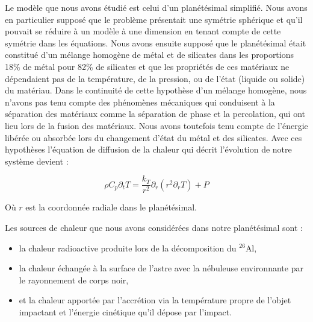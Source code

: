 \documentclass[10pt,a4paper]{article}
\numberwithin{equation}{section}
\begin{document}
Le modèle que nous avons étudié est celui d'un planétésimal simplifié. Nous avons en particulier supposé que le problème présentait une symétrie sphérique et qu'il pouvait se réduire à un modèle à une dimension en tenant compte de cette symétrie dans les équations. Nous avons ensuite supposé que le planétésimal était constitué d'un mélange homogène de métal et de silicates dans les proportions 18\% de métal pour 82\% de silicates et que les propriétés de ces matériaux ne dépendaient pas de la température, de la pression, ou de l'état (liquide ou solide) du matériau. Dans le continuité de cette hypothèse d'un mélange homogène, nous n'avons pas tenu compte des phénomènes mécaniques qui conduisent à la séparation des matériaux comme la séparation de phase et la percolation, qui ont lieu lors de la fusion des matériaux. Nous avons toutefois tenu compte de l’énergie libérée ou absorbée lors du changement d'état du métal et des silicates.
Avec ces hypothèses l'équation de diffusion de la chaleur qui décrit l'évolution de notre système devient :

\begin{equation}
\rho C_p \partial_{t} T = \frac{k_{T}}{r^2} \partial_{r} (  {r}^2 \partial_{r} T)  + P
\end{equation}

Où $r$ est la coordonnée radiale dans le planétésimal.

Les sources de chaleur que nous avons considérées dans notre planétésimal sont :
\begin{itemize}
\item la chaleur radioactive produite lors de la décomposition du $^{26}$Al,
\item la chaleur échangée à la surface de l'astre avec la nébuleuse environnante par le rayonnement de corps noir, 
\item et la chaleur apportée par l’accrétion via la température propre de l'objet impactant et l'énergie cinétique qu'il dépose par l'impact.
\end{itemize}
\end{document}

